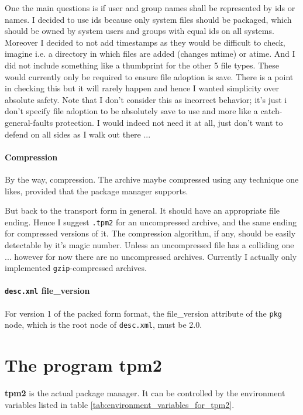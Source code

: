 \documentclass[a4paper]{scrartcl}
\newcommand{\file}[1]{\texttt{#1}}
\newcommand{\program}[1]{\textbf{#1}}
\begin{document}
	One the main questions is if user and group names shall be represented by ids or names. I decided to use ids because only system files should be packaged, which should be owned by system users and groups with equal ids on all systems. Moreover I decided to not add timestamps as they would be difficult to check, imagine i.e. a directory in which files are added (changes mtime) or atime. And I did not include something like a thumbprint for the other 5 file types. These would currently only be required to ensure file adoption is save. There is a point in checking this but it will rarely happen and hence I wanted simplicity over absolute safety. Note that I don't consider this as incorrect behavior; it's just i don't specify file adoption to be absolutely save to use and more like a catch-general-faults protection. I would indeed not need it at all, just don't want to defend on all sides as I walk out there ...
	
	
	\paragraph{Compression}
	
	By the way, compression. The archive maybe compressed using any technique one likes, provided that the package manager supports.
	
	\vspace{1eM}
	But back to the transport form in general. It should have an appropriate file ending. Hence I suggest \file{.tpm2} for an uncompressed archive, and the same ending for compressed versions of it. The compression algorithm, if any, should be easily detectable by it's magic number. Unless an uncompressed file has a colliding one ... however for now there are no uncompressed archives. Currently I actually only implemented \texttt{gzip}-compressed archives.
	
	\paragraph{\file{desc.xml} file\_version} For version 1 of the packed form format, the file\_version attribute of the \texttt{pkg} node, which is the root node of \file{desc.xml}, must be 2.0.
	
	
	\section{The program \program{tpm2}}
	\label{sec:the_program_tpm2}
	
	\program{tpm2} is the actual package manager. It can be controlled by the environment variables listed in table \ref{tab:environment_variables_for_tpm2}.
	
\end{document}
